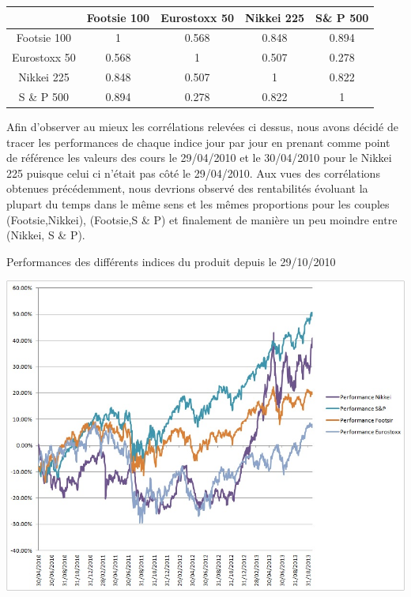\documentclass[french,12pt,a4paper]{article}
\begin{document}
\begin{spacing}{1.2}
\begin{center}
\begin{tabular}{|c|c|c|c|c|}
  \hline
   & Footsie 100 & Eurostoxx 50 & Nikkei 225 & S\& P 500 \\
  \hline
  Footsie 100 & 1 & 0.568 & 0.848 & 0.894\\
  Eurostoxx 50 & 0.568 & 1 & 0.507 & 0.278 \\
  Nikkei 225 & 0.848 & 0.507 & 1 & 0.822\\
  S \& P 500 & 0.894 & 0.278 & 0.822 & 1\\
  \hline
\end{tabular}
\end{center}
\end{spacing}

Afin d'observer au mieux les corrélations relevées ci dessus, nous avons décidé de tracer les performances de chaque indice jour par jour en prenant comme point de référence les valeurs des cours le 29/04/2010 et le 30/04/2010 pour le Nikkei 225 puisque celui ci n'était pas côté le 29/04/2010.
Aux vues des corrélations obtenues précédemment, nous devrions observé des rentabilités évoluant la plupart du temps dans le même sens et les mêmes proportions pour les couples (Footsie,Nikkei), (Footsie,S \& P) et finalement de manière un peu moindre entre (Nikkei, S \& P).


\begin{center}
\caption{Performances des différents indices du produit depuis le 29/10/2010}
\end{center}


\begin{center}
\includegraphics[scale=0.5]{Correlations_indices.jpg}
\end{center}
\end{document}
